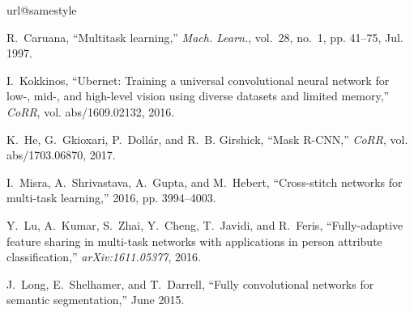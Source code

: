 \documentclass{SSBAtran}
\begin{document}



\begin{thebibliography}{10}
\providecommand{\url}[1]{#1}
\csname url@samestyle\endcsname
\providecommand{\newblock}{\relax}
\providecommand{\bibinfo}[2]{#2}
\providecommand{\BIBentrySTDinterwordspacing}{\spaceskip=0pt\relax}
\providecommand{\BIBentryALTinterwordstretchfactor}{4}
\providecommand{\BIBentryALTinterwordspacing}{\spaceskip=\fontdimen2\font plus
\BIBentryALTinterwordstretchfactor\fontdimen3\font minus
  \fontdimen4\font\relax}
\providecommand{\BIBforeignlanguage}[2]{{%
\expandafter\ifx\csname l@#1\endcsname\relax
\typeout{** WARNING: IEEEtran.bst: No hyphenation pattern has been}%
\typeout{** loaded for the language `#1'. Using the pattern for}%
\typeout{** the default language instead.}%
\else
\language=\csname l@#1\endcsname
\fi
#2}}
\providecommand{\BIBdecl}{\relax}
\BIBdecl

R.~Caruana, ``Multitask learning,'' \emph{Mach. Learn.}, vol.~28, no.~1, pp.
  41--75, Jul. 1997.

I.~Kokkinos, ``Ubernet: Training a universal convolutional
  neural network for low-, mid-, and high-level vision using diverse datasets
  and limited memory,'' \emph{CoRR}, vol. abs/1609.02132, 2016.

K.~He, G.~Gkioxari, P.~Doll{\'{a}}r, and R.~B. Girshick, ``Mask {R-CNN},''
  \emph{CoRR}, vol. abs/1703.06870, 2017.

I.~Misra, A.~Shrivastava, A.~Gupta, and M.~Hebert, ``Cross-stitch networks for
  multi-task learning,'' 2016, pp. 3994--4003.

Y.~Lu, A.~Kumar, S.~Zhai, Y.~Cheng, T.~Javidi, and R.~Feris, ``Fully-adaptive
  feature sharing in multi-task networks with applications in person attribute
  classification,'' \emph{arXiv:1611.05377}, 2016.

J.~Long, E.~Shelhamer, and T.~Darrell, ``Fully convolutional networks for
  semantic segmentation,'' June 2015.


\end{thebibliography}
\end{document}
